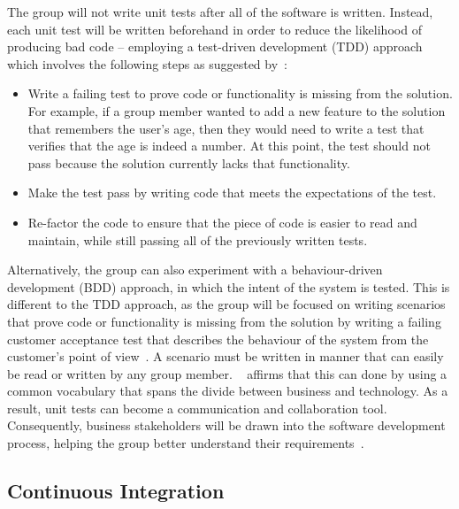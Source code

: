 The group will not write unit tests after all of the software is written. Instead, each unit test will be written beforehand in order to reduce the likelihood of producing bad code -- employing a test-driven development (TDD) approach which involves the following steps as suggested by~\textcite{book:art_of_unit_testing}:

\begin{itemize}
  \item Write a failing test to prove code or functionality is missing from the solution. For example, if a group member wanted to add a new feature to the solution that remembers the user’s age, then they would need to write a test that verifies that the age is indeed a number. At this point, the test should not pass because the solution currently lacks that functionality.
  \item Make the test pass by writing code that meets the expectations of the test.
  \item Re-factor the code to ensure that the piece of code is easier to read and maintain, while still passing all of the previously written tests.
\end{itemize}

Alternatively, the group can also experiment with a behaviour-driven development (BDD) approach, in which the intent of the system is tested. This is different to the TDD approach, as the group will be focused on writing scenarios that prove code or functionality is missing from the solution by writing a failing customer acceptance test that describes the behaviour of the system from the customer's point of view~\parencite{book:art_of_unit_testing}. A scenario must be written in manner that can easily be read or written by any group member. ~\textcite{web:behaviour_driven_development} affirms that this can done by using a common vocabulary that spans the divide between business and technology. As a result, unit tests can become a communication and collaboration tool. Consequently, business stakeholders will be drawn into the software development process, helping the group better understand their requirements~\parencite{web:behaviour_driven_development}.

\subsection{Continuous Integration}

